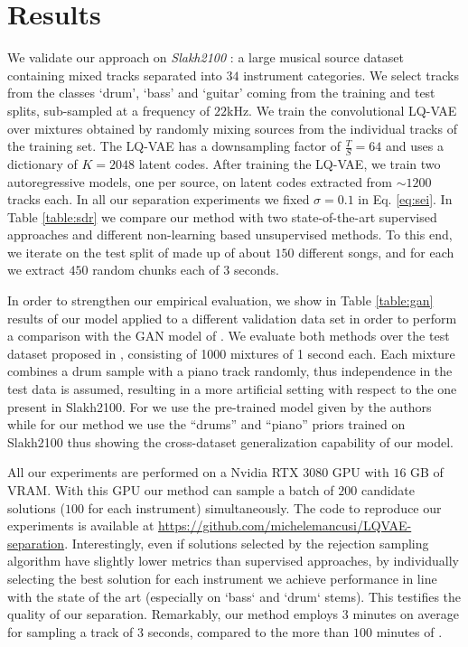 \documentclass[a4paper]{article}
\begin{document}
%
 \section{Results}
\label{sec:experiments}

We validate our approach on \textit{Slakh2100}  \cite{manilow2019}: 
a large musical source dataset containing mixed tracks separated into $34$ instrument categories. We select tracks from the classes `drum', `bass' and `guitar' coming from the training and test splits, sub-sampled at a frequency of $22$kHz. We train the convolutional LQ-VAE over mixtures obtained by randomly mixing sources from the individual tracks of the training set. The LQ-VAE has a downsampling factor of $\frac{T}{S} = 64$ and uses a dictionary of $K = 2048$ latent codes. After training the LQ-VAE, we train two autoregressive models, one per source, on latent codes extracted from $\sim 1200$ tracks each. In all our separation experiments we fixed $\sigma = 0.1$ in Eq. \eqref{eq:sei}.
In Table \ref{table:sdr} we compare our method with two state-of-the-art supervised approaches and different non-learning based unsupervised methods. To this end, we iterate on the test split of \cite{manilow2019} made up of about $150$ different songs, and for each we extract $450$ random chunks each of $3$ seconds. 


In order to strengthen our empirical evaluation, we show in Table \ref{table:gan} results of our model applied to a different validation data set in order to perform a comparison with the GAN model of \cite{narayanaswamy2020unsupervised}. We evaluate both methods over the test dataset
proposed in \cite{narayanaswamy2020unsupervised}, consisting of 1000 mixtures of 1 second each. Each mixture combines a drum sample with a piano track randomly, thus independence
in the test data is assumed, resulting in a more artificial setting with respect
to the one present in Slakh2100. For \cite{narayanaswamy2020unsupervised} we use the pre-trained model
given by the authors while for our method we use the “drums” and “piano” priors trained on Slakh2100 thus showing the cross-dataset generalization
capability of our model.


All our experiments are performed on a Nvidia RTX 3080 GPU with $16$ GB of VRAM. With this GPU our method can sample a batch of $200$ candidate solutions ($100$ for each instrument) simultaneously. The code to reproduce our experiments is available at \url{https://github.com/michelemancusi/LQVAE-separation}.
Interestingly, even if solutions selected by the rejection sampling algorithm have slightly lower metrics than supervised approaches, by individually selecting the best solution for each instrument we achieve performance in line with the state of the art (especially on `bass` and `drum` stems). This testifies the quality of our separation. 
Remarkably, our method employs $3$ minutes on average for sampling a track of $3$ seconds,
compared to the more than $100$ minutes of \cite{jayaram2021}.
\end{document}
